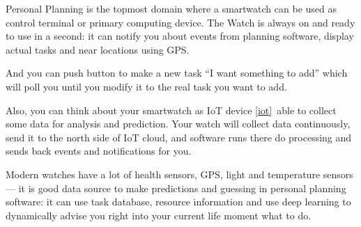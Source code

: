 {}

\noindent
Personal Planning is the topmost domain where a smartwatch can be used as
control terminal or primary computing device. The Watch is always on and ready
to use in a second: it can notify you about events from planning software,
display actual tasks and near locations using GPS.

And you can push button to make a new task “I want something to add” which will
poll you until you modify it to the real task
you want to add.

Also, you can think about your smartwatch as IoT device \ref{iot}\ able to
collect some data for analysis and prediction. Your watch will collect data
continuously, send it to the north side of IoT cloud, and software runs there do
processing and sends back events and notifications for you.

Modern watches have a lot of health sensors, GPS, light and temperature sensors
— it is good data source to make predictions and guessing in personal planning
software: it can use task database, resource
information and use deep learning to dynamically advise you right into your
current life moment what to do.

